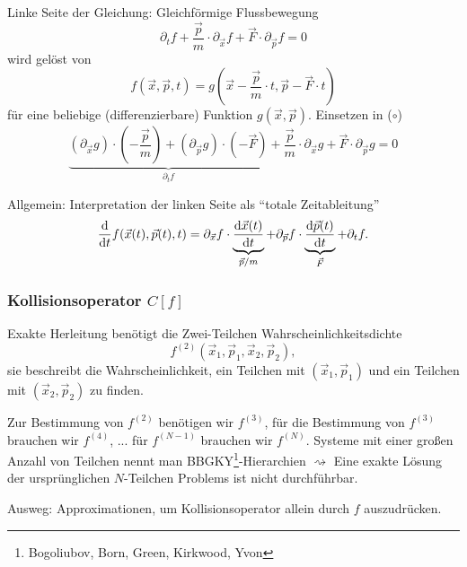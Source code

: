 Linke Seite der Gleichung: Gleichförmige Flussbewegung
\[ \partial_t f + \frac{\vec{p}}{m} \cdot \partial_{\vec{x}} f + \vec{F} \cdot
  \partial_{\vec{p}} f = 0 \tag{$\circ$} \]
wird gelöst von
\[ f( \vec{x}, \vec{p}, t ) = g \left( \vec{x} - \frac{\vec{p}}{m} \cdot t,
    \vec{p} - \vec{F} \cdot t \right) \]
für eine beliebige (differenzierbare) Funktion $g( \vec{x}, \vec{p} )$.
Einsetzen in ($\circ$)
\[ \underbrace{(\partial_{\vec{x}} g) \cdot \left( - \frac{\vec{p}}{m} \right) +
  (\partial_{\vec{p}} g) \cdot (-\vec{F})}_{\partial_t f} +
  \frac{\vec{p}}{m} \cdot \partial_{\vec{x}} g +
  \vec{F} \cdot \partial_{\vec{p}} g = 0
\]

Allgemein: Interpretation der linken Seite als ``totale Zeitableitung''
\[ \frac{\mathrm{d} }{\mathrm{d} t} f( \vec{x}(t), \vec{p}(t), t ) =
  \partial_{\vec{x}} f \cdot \underbrace{\frac{\mathrm{d} \vec{x}(t)}{\mathrm{d} t}}_{\vec{p}/m} +
  \partial_{\vec{p}} f \cdot \underbrace{\frac{\mathrm{d} \vec{p}(t)}{\mathrm{d} t}}_{\vec{F}} +
  \partial_t f.
\]

\subsubsection*{Kollisionsoperator $C[f]$}
Exakte Herleitung benötigt die Zwei-Teilchen Wahrscheinlichkeitsdichte
\[ f^{(2)}( \vec{x}_1, \vec{p}_1, \vec{x}_2, \vec{p}_2), \]
sie beschreibt die Wahrscheinlichkeit, ein Teilchen mit $(\vec{x}_1, \vec{p}_1)$
und ein Teilchen mit $(\vec{x}_2, \vec{p}_2)$ zu finden.

Zur Bestimmung von $f^{(2)}$ benötigen wir $f^{(3)}$, für die Bestimmung von
$f^{(3)}$ brauchen wir $f^{(4)}$, ... für $f^{(N-1)}$ brauchen wir $f^{(N)}$.
Systeme mit einer großen Anzahl von Teilchen nennt man
BBGKY\footnote{Bogoliubov, Born, Green, Kirkwood, Yvon}-Hierarchien
$\rightsquigarrow$ Eine exakte Lösung der ursprünglichen $N$-Teilchen Problems ist
nicht durchführbar.

Ausweg: Approximationen, um Kollisionsoperator allein durch $f$ auszudrücken.

